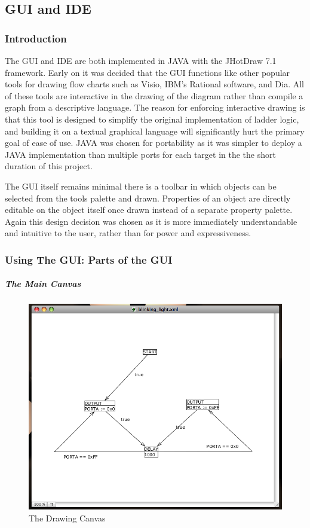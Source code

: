 \subsection{GUI and IDE}
\label{IDE}
\subsubsection{Introduction}

The GUI and IDE are both implemented in JAVA with the JHotDraw 7.1 framework. 
Early on it was decided that the GUI functions like other popular tools for 
drawing flow charts such as Visio, IBM's Rational software, and Dia. 
All of these tools are interactive in the drawing of the diagram rather than 
compile a graph from a descriptive language. The reason for enforcing interactive 
drawing is that this tool is designed to simplify the original implementation 
of ladder logic, and building it on a textual graphical language will
significantly hurt the primary goal of ease of use.
JAVA was chosen for portability as it was simpler to deploy a JAVA implementation 
than multiple ports for each target in the the short duration of this project.

The GUI itself remains minimal there is a toolbar in which objects can be 
selected from the tools palette and drawn. Properties of an object are 
directly editable on the object itself once drawn instead of a separate 
property palette. Again this design decision was chosen as it is more 
immediately understandable and intuitive to the user, rather than for 
power and expressiveness.

\subsubsection{Using The GUI: Parts of the GUI}

\subparagraph{The Main Canvas}

\begin{figure}[htp]
    \centering
    \includegraphics[width=\imgmedium]{./images/plcedit_canvas.png}
    \caption{The Drawing Canvas}
    \label{fig:plcedit_canvas}
\end{figure}


